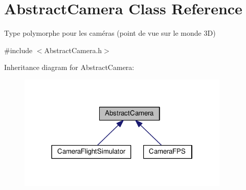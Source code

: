 \hypertarget{classAbstractCamera}{\section{Abstract\+Camera Class Reference}
\label{classAbstractCamera}
}


Type polymorphe pour les caméras (point de vue sur le monde 3\+D)  




{\ttfamily \#include $<$Abstract\+Camera.\+h$>$}



Inheritance diagram for Abstract\+Camera\+:\nopagebreak
\begin{figure}[H]
\begin{center}
\leavevmode
\includegraphics[width=286pt]{classAbstractCamera__inherit__graph}
\end{center}
\end{figure}
